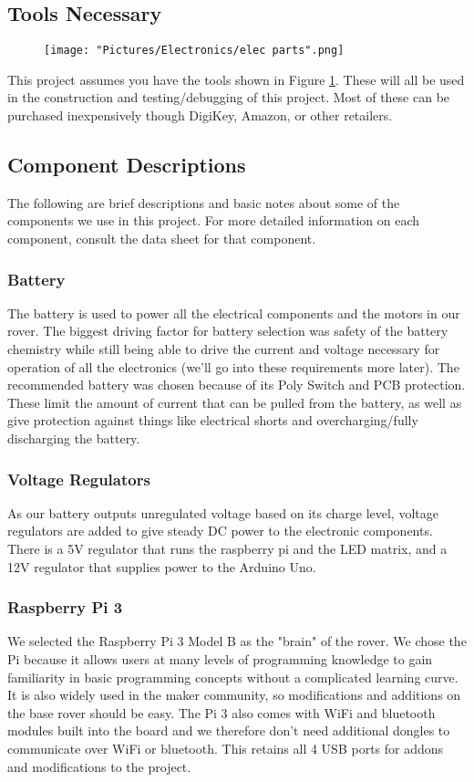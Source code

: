 \documentclass{article}
\begin{document}
\subsection{Tools Necessary}

\begin{figure}[H]
  	\centering
   	\texttt{[image: "Pictures/Electronics/elec parts".png]}
  	\caption{}
	\label{elec parts}
\end{figure}

This project assumes you have the tools shown in Figure \ref{elec parts}. These will all be used in the construction and testing/debugging of this project. Most of these can be purchased inexpensively though DigiKey, Amazon, or other retailers. 

\subsection{Component Descriptions}
The following are brief descriptions and basic notes about some of the components we use in this project. For more detailed information on each component, consult the data sheet for that component. 
\subsubsection{Battery}
The battery is used to power all the electrical components and the motors in our rover. The biggest driving factor for battery selection was safety of the battery chemistry while still being able to drive the current and voltage necessary for operation of all the electronics (we'll go into these requirements more later). The recommended battery was chosen because of its Poly Switch and PCB protection. These limit the amount of current that can be pulled from the battery, as well as give protection against things like electrical shorts and overcharging/fully discharging the battery. 
\subsubsection{Voltage Regulators}
As our battery outputs unregulated voltage based on its charge level, voltage regulators are added to give steady DC power to the electronic components. There is a 5V regulator that runs the raspberry pi and the LED matrix, and a 12V regulator that supplies power to the Arduino Uno.
\subsubsection{Raspberry Pi 3}
We selected the Raspberry Pi 3 Model B as the "brain" of the rover. We chose the Pi because it allows users at many levels of programming knowledge to gain familiarity in basic programming concepts without a complicated learning curve. It is also widely used in the maker community, so modifications and additions on the base rover should be easy. The Pi 3 also comes with WiFi and bluetooth modules built into the board and we therefore don't need additional dongles to communicate over WiFi or bluetooth.  This retains all 4 USB ports for addons and modifications to the project.  
\end{document}
